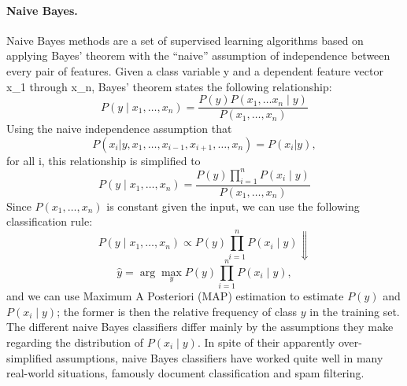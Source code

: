 
\paragraph{Naive Bayes.}
\label{naiveBayes}
Naive Bayes methods are a set of supervised learning algorithms based on
applying Bayes' theorem with the “naive” assumption of independence
between every pair of features.
%
Given a class variable y and a dependent feature vector x\_1 through x\_n,
Bayes' theorem states the following relationship:
\begin{equation}
P(y \mid x_1, \dots, x_n) = \frac{P(y) P(x_1, \dots x_n \mid y)}
{P(x_1, \dots, x_n)}
\end{equation}
Using the naive independence assumption that
\begin{equation}
P(x_i | y, x_1, \dots, x_{i-1}, x_{i+1}, \dots, x_n) = P(x_i | y),
\end{equation}
for all i, this relationship is simplified to
\begin{equation}
P(y \mid x_1, \dots, x_n) = \frac{P(y) \prod_{i=1}^{n} P(x_i \mid y)}
{P(x_1, \dots, x_n)}
\end{equation}
Since $P(x_1, \dots, x_n)$ is constant given the input, we can use the following
classification rule:
\begin{equation}
P(y \mid x_1, \dots, x_n) \propto P(y) \prod_{i=1}^{n} P(x_i \mid y)
\Downarrow
\end{equation}
\begin{equation}
\hat{y} = \arg\max_y P(y) \prod_{i=1}^{n} P(x_i \mid y),
\end{equation}
and we can use Maximum A Posteriori (MAP) estimation to estimate $P(y)$ and
$P(x_i \mid y)$; the former is then the relative frequency of class $y$ in the
training set.
%
The different naive Bayes classifiers differ mainly by the assumptions they make
regarding the distribution of $P(x_i \mid y)$.
%
In spite of their apparently over-simplified assumptions, naive Bayes
classifiers have worked quite well in many real-world situations, famously
document classification and spam filtering.
